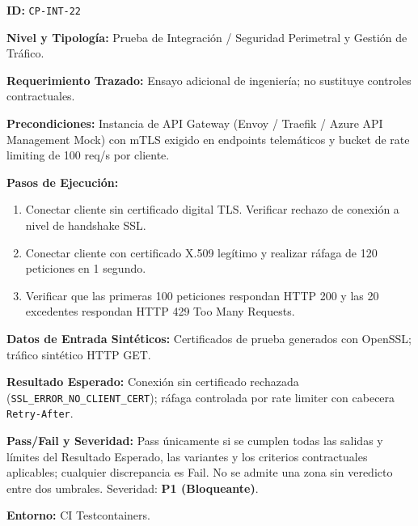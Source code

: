 \par\noindent\textbf{ID:} \texttt{C\allowbreak{}P\allowbreak{}-\allowbreak{}I\allowbreak{}N\allowbreak{}T\allowbreak{}-\allowbreak{}2\allowbreak{}2\allowbreak{}}\par
\par\noindent\textbf{Nivel y Tipología:} Prueba de Integración / Seguridad Perimetral y Gestión de Tráfico.\par
\par\noindent\textbf{Requerimiento Trazado:} Ensayo adicional de ingeniería; no sustituye controles contractuales.\par
\par\noindent\textbf{Precondiciones:} Instancia de API Gateway (Envoy / Traefik / Azure API Management Mock) con mTLS exigido en endpoints telemáticos y bucket de rate limiting de 100 req/s por cliente.\par
\par\noindent\textbf{Pasos de Ejecución:} \par
\begin{enumerate}
\item Conectar cliente sin certificado digital TLS. Verificar rechazo de conexión a nivel de handshake SSL.
\item Conectar cliente con certificado X.509 legítimo y realizar ráfaga de 120 peticiones en 1 segundo.
\item Verificar que las primeras 100 peticiones respondan HTTP 200 y las 20 excedentes respondan HTTP 429 Too Many Requests.
\end{enumerate}
\par\noindent\textbf{Datos de Entrada Sintéticos:} Certificados de prueba generados con OpenSSL; tráfico sintético HTTP GET.\par
\par\noindent\textbf{Resultado Esperado:} Conexión sin certificado rechazada (\texttt{S\allowbreak{}S\allowbreak{}L\allowbreak{}\_\allowbreak{}E\allowbreak{}R\allowbreak{}R\allowbreak{}O\allowbreak{}R\allowbreak{}\_\allowbreak{}N\allowbreak{}O\allowbreak{}\_\allowbreak{}C\allowbreak{}L\allowbreak{}I\allowbreak{}E\allowbreak{}N\allowbreak{}T\allowbreak{}\_\allowbreak{}C\allowbreak{}E\allowbreak{}R\allowbreak{}T\allowbreak{}}); ráfaga controlada por rate limiter con cabecera \texttt{R\allowbreak{}e\allowbreak{}t\allowbreak{}r\allowbreak{}y\allowbreak{}-\allowbreak{}A\allowbreak{}f\allowbreak{}t\allowbreak{}e\allowbreak{}r\allowbreak{}}.\par
\par\noindent\textbf{Pass/Fail y Severidad:} Pass únicamente si se cumplen todas las salidas y límites del Resultado Esperado, las variantes y los criterios contractuales aplicables; cualquier discrepancia es Fail. No se admite una zona sin veredicto entre dos umbrales. Severidad: \textbf{P1 (Bloqueante)}.\par
\par\noindent\textbf{Entorno:} CI Testcontainers.\par






